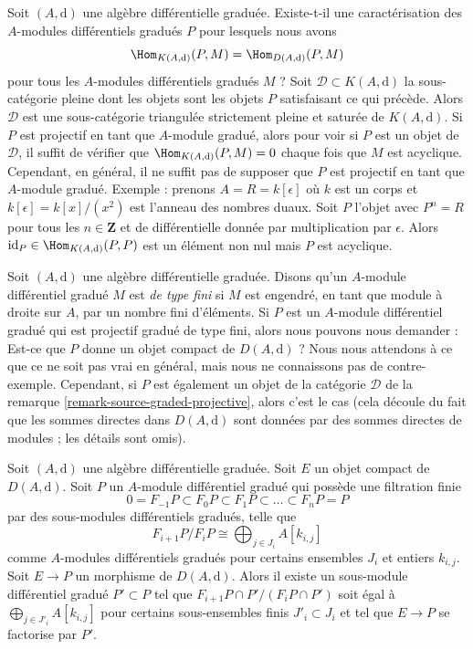 \begin{remark}
\label{remark-source-graded-projective}
Soit $(A, \text{d})$ une algèbre différentielle graduée. Existe-t-il
une caractérisation des $A$-modules différentiels gradués $P$ pour
lesquels nous avons
$$
\Hom_{K(A, \text{d})}(P, M) = \Hom_{D(A, \text{d})}(P, M)
$$
pour tous les $A$-modules différentiels gradués $M$ ?
Soit $\mathcal{D} \subset K(A, \text{d})$ la sous-catégorie pleine
dont les objets sont les objets $P$ satisfaisant ce qui précède. Alors
$\mathcal{D}$ est une sous-catégorie triangulée strictement pleine et saturée de $K(A,
\text{d})$. Si $P$ est projectif en tant que $A$-module gradué, alors pour voir si
$P$ est un objet de $\mathcal{D}$, il suffit de vérifier que
$\Hom_{K(A, \text{d})}(P, M) = 0$ chaque fois que $M$ est
acyclique. Cependant, en général, il ne suffit pas de supposer que $P$ est projectif en
tant que $A$-module gradué. Exemple : prenons $A = R = k[\epsilon]$ où $k$ est
un corps et $k[\epsilon] = k[x]/(x^2)$ est l'anneau des nombres duaux. Soit
$P$ l'objet avec $P^n = R$ pour tous les $n \in \mathbf{Z}$ et de
différentielle donnée par multiplication par $\epsilon$. Alors
$\text{id}_P \in \Hom_{K(A, \text{d})}(P, P)$ est un élément non nul mais $P$ est
acyclique.
\end{remark}

\begin{remark}
\label{remark-graded-projective-is-compact}
Soit $(A, \text{d})$ une algèbre différentielle graduée. Disons qu'un
$A$-module différentiel gradué $M$ est {\it de type fini} si $M$ est engendré, en tant que
module à droite sur $A$, par un nombre fini d'éléments. Si $P$ est un
$A$-module différentiel gradué qui est projectif gradué de type fini, alors nous
pouvons nous demander : Est-ce que $P$ donne un objet compact de $D(A, \text{d})$ ? Nous
nous attendons à ce que ce ne soit pas vrai en général, mais nous ne
connaissons pas de contre-exemple. Cependant, si $P$ est également un objet de la
catégorie $\mathcal{D}$ de la remarque \ref{remark-source-graded-projective},
alors c'est le cas (cela découle du fait que les sommes directes dans $D(A,
\text{d})$ sont données par des sommes directes de modules ; les détails sont omis).
\end{remark}

\begin{lemma}
\label{lemma-factor-through-nicer}
Soit $(A, \text{d})$ une algèbre différentielle graduée. Soit $E$ un objet
compact de $D(A, \text{d})$. Soit $P$ un $A$-module différentiel gradué qui
possède une filtration finie
$$
0 = F_{-1}P \subset F_0P \subset F_1P \subset \ldots \subset F_nP = P
$$
par des sous-modules différentiels gradués, telle que
$$
F_{i + 1}P/F_iP \cong \bigoplus\nolimits_{j \in J_i} A[k_{i, j}]
$$
comme $A$-modules différentiels gradués pour certains ensembles $J_i$ et entiers
$k_{i, j}$. Soit $E \to P$ un morphisme de $D(A,
\text{d})$. Alors il existe un sous-module différentiel gradué $P' \subset P$ tel que
$F_{i + 1}P \cap P'/(F_iP \cap P')$ soit égal à
$\bigoplus_{j \in J'_i} A[k_{i, j}]$ pour certains sous-ensembles
finis $J'_i \subset J_i$ et tel que $E \to P$ se factorise par $P'$.
\end{lemma}


